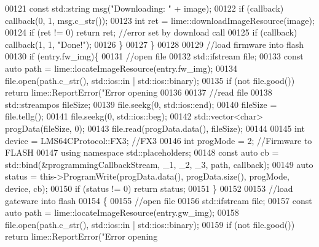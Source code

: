 \begin{DoxyCode}
{{{{00121             \textcolor{keyword}{const} std::string msg(\textcolor{stringliteral}{"Downloading: "} + image);
00122             \textcolor{keywordflow}{if} (callback) callback(0, 1, msg.c\_str());
00123             \textcolor{keywordtype}{int} ret = lime::downloadImageResource(image);
00124             \textcolor{keywordflow}{if} (ret != 0) \textcolor{keywordflow}{return} ret; \textcolor{comment}{//error set by download call}
00125             \textcolor{keywordflow}{if} (callback) callback(1, 1, \textcolor{stringliteral}{"Done!"});
00126         \}
00127     \}
00128 
00129     \textcolor{comment}{//load firmware into flash}
00130     \textcolor{keywordflow}{if} (entry.fw\_img)\{
00131         \textcolor{comment}{//open file}
00132         std::ifstream file;
00133         \textcolor{keyword}{const} \textcolor{keyword}{auto} path = lime::locateImageResource(entry.fw\_img);
00134         file.open(path.c\_str(), std::ios::in | std::ios::binary);
00135         \textcolor{keywordflow}{if} (not file.good()) \textcolor{keywordflow}{return} lime::ReportError(\textcolor{stringliteral}{"Error opening %
00136 
00137         \textcolor{comment}{//read file}
00138         std::streampos fileSize;
00139         file.seekg(0, std::ios::end);
00140         fileSize = file.tellg();
00141         file.seekg(0, std::ios::beg);
00142         std::vector<char> progData(fileSize, 0);
00143         file.read(progData.data(), fileSize);
00144 
00145         \textcolor{keywordtype}{int} device = LMS64CProtocol::FX3; \textcolor{comment}{//FX3}
00146         \textcolor{keywordtype}{int} progMode = 2; \textcolor{comment}{//Firmware to FLASH}
00147         \textcolor{keyword}{using namespace }std::placeholders;
00148         \textcolor{keyword}{const} \textcolor{keyword}{auto} cb = std::bind(&programmingCallbackStream, \_1, \_2, \_3, path, callback);
00149         \textcolor{keyword}{auto} status = this->ProgramWrite(progData.data(), progData.size(), progMode, 
      device, cb);
00150         \textcolor{keywordflow}{if} (status != 0) \textcolor{keywordflow}{return} status;
00151     \}
00152 
00153     \textcolor{comment}{//load gateware into flash}
00154     \{
00155         \textcolor{comment}{//open file}
00156         std::ifstream file;
00157         \textcolor{keyword}{const} \textcolor{keyword}{auto} path = lime::locateImageResource(entry.gw\_img);
00158         file.open(path.c\_str(), std::ios::in | std::ios::binary);
00159         \textcolor{keywordflow}{if} (not file.good()) \textcolor{keywordflow}{return} lime::ReportError(\textcolor{stringliteral}{"Error opening %
}}}}}}
\end{DoxyCode}
